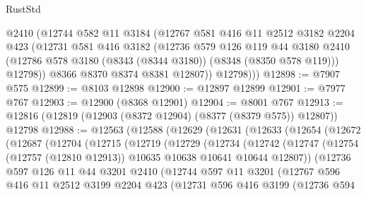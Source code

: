 \begin{lexlean}{RustStd}
\begin{coremodule}
{\begin{coremodule}
{{{{{{{{{{{{{{{{{{{{{{{{{{{{{{{{{{{{{{{{{{{{{{{{{{          @2410
          (@12744
            @582
            @11
            @3184
            (@12767
              @581
              @416
              @11
              @2512
              @3182
              @2204
              @423
              (@12731
                @581
                @416
                @3182
                (@12736
                  @579
                  @126
                  @119
                  @44
                  @3180
                  @2410
                  (@12786 @578 @3180 (@8343 (@8344 @3180)) (@8348 (@8350 @578 @119)))
                  @12798))
              @8366
              @8370
              @8374
              @8381
              @12807))
          @12798)))
@12898 := @7907 @575
@12899 := @8103 @12898
@12900 := @12897 @12899
@12901 := @7977 @767
@12903 := @12900 (@8368 @12901)
@12904 := @8001 @767
@12913 := @12816 (@12819 (@12903 (@8372 @12904) (@8377 (@8379 @575)) @12807)) @12798
@12988 := @12563
    (@12588
      (@12629
        (@12631
          (@12633
            (@12654
              (@12672
                (@12687
                  (@12704
                    (@12715
                      (@12719
                        (@12729
                          (@12734
                            (@12742
                              (@12747
                                (@12754
                                  (@12757 (@12810 @12913))
                                  @10635
                                  @10638
                                  @10641
                                  @10644
                                  @12807))
                              (@12736
                                @597
                                @126
                                @11
                                @44
                                @3201
                                @2410
                                (@12744
                                  @597
                                  @11
                                  @3201
                                  (@12767
                                    @596
                                    @416
                                    @11
                                    @2512
                                    @3199
                                    @2204
                                    @423
                                    (@12731
                                      @596
                                      @416
                                      @3199
                                      (@12736
                                        @594
}}}}}}}}}}}}}}}}}}}}}}}}}}}}}}}}}}}}}}}}}}}}}}}}}}
\end{coremodule}}
\end{coremodule}
\end{lexlean}
